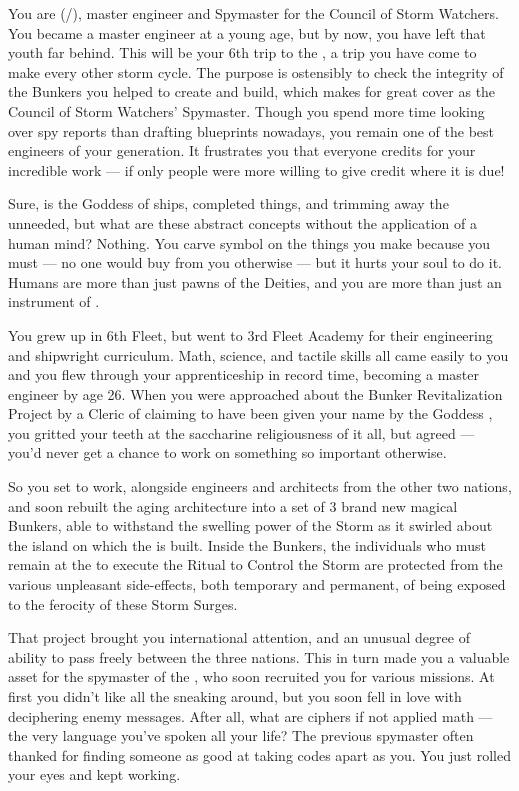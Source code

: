 \documentclass[char]{GL2020}
\begin{document}
\name{\cBunker{}}

You are \cBunker{\full} (\cBunker{\they}/\cBunker{\them}), master engineer and Spymaster for the \pShip{} Council of Storm Watchers. You became a master engineer at a young age, but by now, you have left that youth far behind. This will be your 6th trip to the \pSchool{}, a trip you have come to make every other storm cycle. The purpose is ostensibly to check the integrity of the Bunkers you helped to create and build, which makes for great cover as the Council of Storm Watchers’ Spymaster. Though you spend more time looking over spy reports than drafting blueprints nowadays, you remain one of the best engineers of your generation. It frustrates you that everyone credits \cEbb{} for your incredible work — if only people were more willing to give credit where it is due!

Sure, \cEbb{} is the Goddess of ships, completed things, and trimming away the unneeded, but what are these abstract concepts without the application of a human mind? Nothing. You carve \cEbb{\their} symbol on the things you make because you must — no one would buy from you otherwise — but it hurts your soul to do it. Humans are more than just pawns of the Deities, and you are more than just an instrument of \cEbb{\them}.

You grew up in 6th Fleet, but went to 3rd Fleet Academy for their engineering and shipwright curriculum. Math, science, and tactile skills all came easily to you and you flew through your apprenticeship in record time, becoming a master engineer by age 26. When you were approached about the Bunker Revitalization Project by a Cleric of \cEbb{} claiming to have been given your name by the Goddess \cEbb{\themself}, you gritted your teeth at the saccharine religiousness of it all, but agreed — you'd never get a chance to work on something so important otherwise. 

So you set to work, alongside engineers and architects from the other two nations, and soon rebuilt the aging architecture into a set of 3 brand new magical Bunkers, able to withstand the swelling power of the Storm as it swirled about the island on which the \pSchool{} is built. Inside the Bunkers, the individuals who must remain at the \pSc{} to execute the Ritual to Control the Storm are protected from the various unpleasant side-effects, both temporary and permanent, of being exposed to the ferocity of these Storm Surges.

That project brought you international attention, and an unusual degree of ability to pass freely between the three nations. This in turn made you a valuable asset for the spymaster of the \pShip{}, who soon recruited you for various missions. At first you didn't like all the sneaking around, but you soon fell in love with deciphering enemy messages. After all, what are ciphers if not applied math — the very language you've spoken all your life? The previous spymaster often thanked \cEbb{} for finding someone as good at taking codes apart as you. You just rolled your eyes and kept working.
\end{document}
